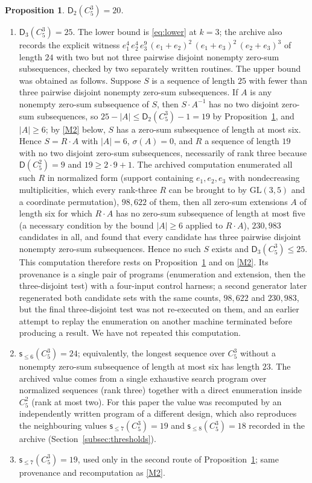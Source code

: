 \documentclass[10pt,a4paper]{amsart}
\newtheorem{proposition}{Proposition}
\newcommand{\C}{C_5^{3}}
\newcommand{\Dk}{\mathsf{D}}
\newcommand{\sle}[1]{\mathsf{s}_{\le #1}}
\begin{document}
\begin{proposition}\label{prop:D2}
$\Dk_2(\C)=20$.
\end{proposition}

\begin{enumerate}[label=\textup{(M\arabic*)},leftmargin=3em]
\item\label{M1} $\Dk_3(\C)=25$. The lower bound is \eqref{eq:lower} at $k=3$; the archive also records the explicit witness $e_1^4\,e_2^4\,e_3^9\,(e_1+e_2)^2\,(e_1+e_3)^2\,(e_2+e_3)^3$ of length $24$ with two but not three pairwise disjoint nonempty zero-sum subsequences, checked by two separately written routines. The upper bound was obtained as follows. Suppose $S$ is a sequence of length $25$ with fewer than three pairwise disjoint nonempty zero-sum subsequences. If $A$ is any nonempty zero-sum subsequence of $S$, then $S\cdot A^{-1}$ has no two disjoint zero-sum subsequences, so $25-|A|\le\Dk_2(\C)-1=19$ by Proposition~\ref{prop:D2}, and $|A|\ge6$; by \ref{M2} below, $S$ has a zero-sum subsequence of length at most six. Hence $S=R\cdot A$ with $|A|=6$, $\sigma(A)=0$, and $R$ a sequence of length $19$ with no two disjoint zero-sum subsequences, necessarily of rank three because $\Dk(C_5^2)=9$ and $19\ge2\cdot9+1$. The archived computation enumerated all such $R$ in normalized form (support containing $e_1,e_2,e_3$ with nondecreasing multiplicities, which every rank-three $R$ can be brought to by $\mathrm{GL}(3,5)$ and a coordinate permutation), $98{,}622$ of them, then all zero-sum extensions $A$ of length six for which $R\cdot A$ has no zero-sum subsequence of length at most five (a necessary condition by the bound $|A|\ge6$ applied to $R\cdot A$), $230{,}983$ candidates in all, and found that every candidate has three pairwise disjoint nonempty zero-sum subsequences. Hence no such $S$ exists and $\Dk_3(\C)\le25$. This computation therefore rests on Proposition~\ref{prop:D2} and on \ref{M2}. Its provenance is a single pair of programs (enumeration and extension, then the three-disjoint test) with a four-input control harness; a second generator later regenerated both candidate sets with the same counts, $98{,}622$ and $230{,}983$, but the final three-disjoint test was not re-executed on them, and an earlier attempt to replay the enumeration on another machine terminated before producing a result. We have not repeated this computation.
\item\label{M2} $\sle{6}(\C)=24$; equivalently, the longest sequence over $\C$ without a nonempty zero-sum subsequence of length at most six has length $23$. The archived value comes from a single exhaustive search program over normalized sequences (rank three) together with a direct enumeration inside $C_5^2$ (rank at most two). For this paper the value was recomputed by an independently written program of a different design, which also reproduces the neighbouring values $\sle{7}(\C)=19$ and $\sle{8}(\C)=18$ recorded in the archive (Section~\ref{subsec:thresholds}).
\item\label{M3} $\sle{7}(\C)=19$, used only in the second route of Proposition~\ref{prop:D2}; same provenance and recomputation as \ref{M2}.
\end{enumerate}
\end{document}
